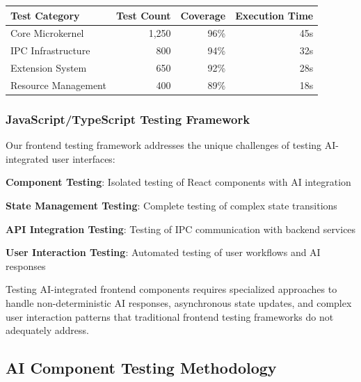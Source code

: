 \begin{center}
\begin{tabular}{@{}lrrr@{}}
\toprule
\textbf{Test Category} & \textbf{Test Count} & \textbf{Coverage} & \textbf{Execution Time} \\
\midrule
Core Microkernel & 1,250 & 96\% & 45s \\
IPC Infrastructure & 800 & 94\% & 32s \\
Extension System & 650 & 92\% & 28s \\
Resource Management & 400 & 89\% & 18s \\
\bottomrule
\end{tabular}
\end{center}

\subsubsection*{JavaScript/TypeScript Testing Framework}

Our frontend testing framework addresses the unique challenges of testing AI-integrated user interfaces:

\begin{compactlist}
    \item \textbf{Component Testing}: Isolated testing of React components with AI integration
    \item \textbf{State Management Testing}: Complete testing of complex state transitions
    \item \textbf{API Integration Testing}: Testing of IPC communication with backend services
    \item \textbf{User Interaction Testing}: Automated testing of user workflows and AI responses
\end{compactlist}

\begin{infobox}[title=Frontend Testing Challenges]
Testing AI-integrated frontend components requires specialized approaches to handle non-deterministic AI responses, asynchronous state updates, and complex user interaction patterns that traditional frontend testing frameworks do not adequately address.
\end{infobox}

\subsection*{AI Component Testing Methodology}

